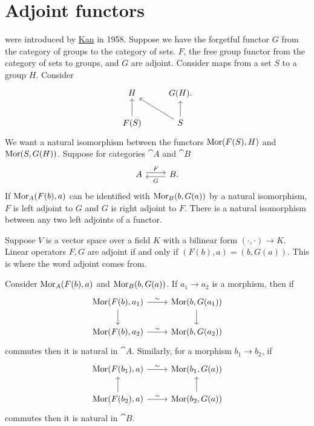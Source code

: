 \documentclass[11pt, oneside]{article}
\begin{document}
\section{Adjoint functors}
\href{https://en.wikipedia.org/wiki/Adjoint_functors}{} were introduced by \href{https://en.wikipedia.org/wiki/Daniel_Kan}{\color{black}Kan} in 1958. Suppose we have the forgetful functor $G$ from the category of groups to the category of sets. $F$, the free group functor from the category of sets to groups, and $G$ are adjoint. Consider maps from a set $S$ to a group $H$. Consider
\[
\begin{tikzcd}
H & G(H). \\
F(S) \arrow[u] & S \arrow[u]\arrow[lu]
\end{tikzcd}
\]
We want a natural isomorphism between the functors $\operatorname{Mor} (F(S), H)$ and $\operatorname{Mor} (S, G(H))$. Suppose for categories $\cat A$ and $\cat B$
\[
\begin{tikzcd}
\cat A \arrow[r, shift left, "F"]& \cat B\arrow[l, shift left, "G"].
\end{tikzcd}
\]
If $\operatorname{Mor}_{\relax A}(F(b), a)$ can be identified with $\operatorname{Mor}_{\relax B}(b, G(a))$ by a natural isomorphism, $F$ is left adjoint to $G$ and $G$ is right adjoint to $F$. There is a natural isomorphism between any two left adjoints of a functor.

Suppose $V$ is a vector space over a field $K$ with a bilinear form $(\cdot,\cdot)\longrightarrow K$. Linear operators $F, G$ are adjoint if and only if $(F(b), a)=(b, G(a))$. This is where the word adjoint comes from.

Consider $\operatorname{Mor}_{\relax A}(F(b), a)$ and $\operatorname{Mor}_{\relax B}(b, G(a))$. If $a_1\longrightarrow a_2$ is a morphism, then if
\[
\begin{tikzcd}
\Mor(F(b), a_1) \arrow[r,"\sim"] \arrow[d, ] &\Mor (b, G(a_1)) \arrow[d,]\\ \Mor(F(b), a_2)\arrow[r, "\sim"] & \Mor(b, G(a_2))
\end{tikzcd}
\]
commutes then it is natural in $\cat A$. Similarly, for a morphism $b_1\longrightarrow b_2$, if
\[
\begin{tikzcd}
\Mor(F(b_1), a) \arrow[r, "\sim"] &\Mor (b_1, G(a)) \\ \Mor(F(b_2), a)\arrow[r, "\sim"] \arrow[u]& \Mor(b_2, G(a)) \arrow[u]
\end{tikzcd}
\]
commutes then it is natural in $\cat B$.
\end{document}
